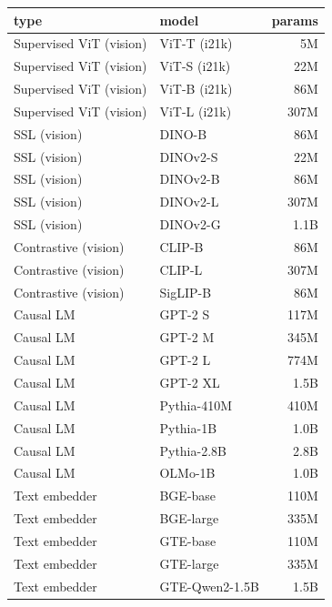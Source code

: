 \begin{table}[H]
\centering
\scriptsize
\setlength{\tabcolsep}{4pt}
\begin{tabular}{llr}
\toprule
type & model & params \\
\midrule
Supervised ViT (vision) & ViT-T (i21k) \citep{dosovitskiy2021an} & 5M \\
Supervised ViT (vision) & ViT-S (i21k) \citep{dosovitskiy2021an} & 22M \\
Supervised ViT (vision) & ViT-B (i21k) \citep{dosovitskiy2021an} & 86M \\
Supervised ViT (vision) & ViT-L (i21k) \citep{dosovitskiy2021an} & 307M \\
SSL (vision) & DINO-B \citep{dinov1} & 86M \\
SSL (vision) & DINOv2-S \citep{dinov2} & 22M \\
SSL (vision) & DINOv2-B \citep{dinov2} & 86M \\
SSL (vision) & DINOv2-L \citep{dinov2} & 307M \\
SSL (vision) & DINOv2-G \citep{dinov2} & 1.1B \\
Contrastive (vision) & CLIP-B \citep{CLIP} & 86M \\
Contrastive (vision) & CLIP-L \citep{CLIP} & 307M \\
Contrastive (vision) & SigLIP-B \citep{siglip} & 86M \\
\midrule
Causal LM & GPT-2 S \citep{gpt2} & 117M \\
Causal LM & GPT-2 M \citep{gpt2} & 345M \\
Causal LM & GPT-2 L \citep{gpt2} & 774M \\
Causal LM & GPT-2 XL \citep{gpt2} & 1.5B \\
Causal LM & Pythia-410M \citep{pythia} & 410M \\
Causal LM & Pythia-1B \citep{pythia} & 1.0B \\
Causal LM & Pythia-2.8B \citep{pythia} & 2.8B \\
Causal LM & OLMo-1B \citep{olmo} & 1.0B \\
Text embedder & BGE-base \citep{BGE} & 110M \\
Text embedder & BGE-large \citep{BGE} & 335M \\
Text embedder & GTE-base \citep{gte} & 110M \\
Text embedder & GTE-large \citep{gte} & 335M \\
Text embedder & GTE-Qwen2-1.5B \citep{gte} & 1.5B \\

\end{tabular}
\end{table}
